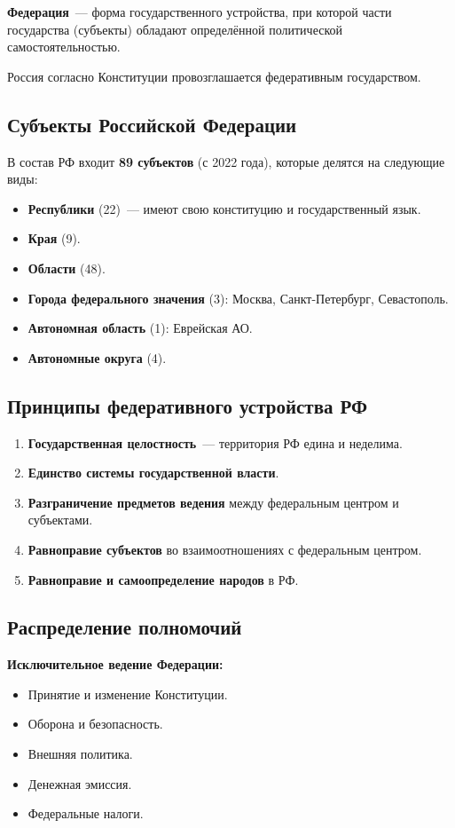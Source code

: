\documentclass[12pt]{article}
\begin{document}
	\textbf{Федерация}~--- форма государственного устройства, при которой части государства (субъекты) обладают определённой политической самостоятельностью.
	
	Россия согласно Конституции провозглашается федеративным государством.
	
	\subsection{Субъекты Российской Федерации}
	
	В состав РФ входит \textbf{89 субъектов} (с 2022 года), которые делятся на следующие виды:
	\begin{itemize}
		\item \textbf{Республики} (22)~--- имеют свою конституцию и государственный язык.
		\item \textbf{Края} (9).
		\item \textbf{Области} (48).
		\item \textbf{Города федерального значения} (3): Москва, Санкт-Петербург, Севастополь.
		\item \textbf{Автономная область} (1): Еврейская АО.
		\item \textbf{Автономные округа} (4).
	\end{itemize}
	
	\subsection{Принципы федеративного устройства РФ}
	\begin{enumerate}
		\item \textbf{Государственная целостность}~--- территория РФ едина и неделима.
		\item \textbf{Единство системы государственной власти}.
		\item \textbf{Разграничение предметов ведения} между федеральным центром и субъектами.
		\item \textbf{Равноправие субъектов} во взаимоотношениях с федеральным центром.
		\item \textbf{Равноправие и самоопределение народов} в РФ.
	\end{enumerate}
	
	\subsection{Распределение полномочий}
	
	\textbf{Исключительное ведение Федерации:}
	\begin{itemize}
		\item Принятие и изменение Конституции.
		\item Оборона и безопасность.
		\item Внешняя политика.
		\item Денежная эмиссия.
		\item Федеральные налоги.
	\end{itemize}
	
\end{document}
